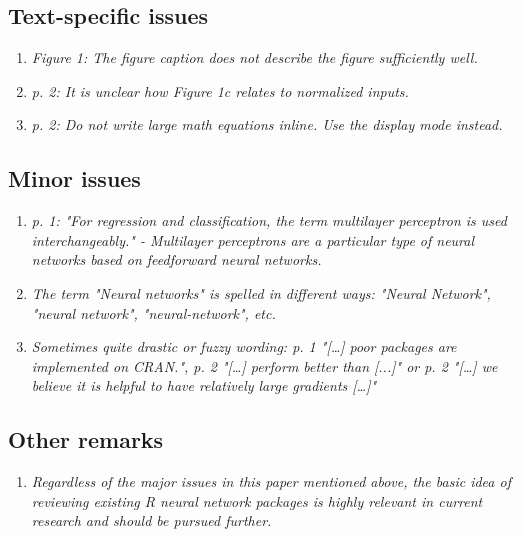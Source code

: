 \documentclass[12pt]{article}
\begin{document}
\subsection*{Text-specific issues}

\begin{enumerate}
\item \textit{Figure 1: The figure caption does not describe the figure sufficiently well.}

\textbf{}
\item \textit{p. 2: It is unclear how Figure 1c relates to normalized inputs.}

\textbf{}

\item \textit{p. 2: Do not write large math equations inline. Use the display mode instead.}

\textbf{}
\end{enumerate}

\subsection*{Minor issues}

\begin{enumerate}
\item \textit{p. 1: "For regression and classification, the term multilayer perceptron is used interchangeably." - Multilayer perceptrons are a particular type of neural networks based on feedforward neural networks.}

\item \textit{The term "Neural networks" is spelled in different ways: "Neural Network", "neural network", "neural-network", etc.}

\item \textit{Sometimes quite drastic or fuzzy wording: p. 1 "[…] poor packages are implemented on CRAN.", p. 2 "[…] perform better than [...]" or p. 2 "[…] we believe it is helpful to have relatively large gradients […]"}

\end{enumerate}

\subsection*{Other remarks}

\begin{enumerate}
\item \textit{Regardless of the major issues in this paper mentioned above, the basic idea of reviewing existing R neural network packages is highly relevant in current research and should be pursued further.
}
\end{enumerate}
\end{document}
